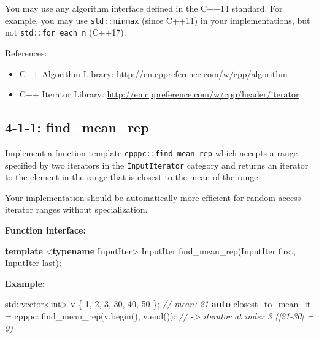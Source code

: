 \documentclass[]{article}
\newenvironment{Shaded}{}{}
\newcommand{\KeywordTok}[1]{\textcolor[rgb]{0.00,0.44,0.13}{\textbf{{#1}}}}
\newcommand{\DataTypeTok}[1]{\textcolor[rgb]{0.56,0.13,0.00}{{#1}}}
\newcommand{\DecValTok}[1]{\textcolor[rgb]{0.25,0.63,0.44}{{#1}}}
\newcommand{\CommentTok}[1]{\textcolor[rgb]{0.38,0.63,0.69}{\textit{{#1}}}}
\newcommand{\NormalTok}[1]{{#1}}
\providecommand{\tightlist}{%
  \setlength{\itemsep}{0pt}\setlength{\parskip}{0pt}}
\begin{document}
You may use any algorithm interface defined in the C++14 standard. For
example, you may use \texttt{std::minmax} (since C++11) in your
implementations, but not \texttt{std::for\_each\_n} (C++17).

References:

\begin{itemize}
\tightlist
\item
  C++ Algorithm Library:
  \url{http://en.cppreference.com/w/cpp/algorithm}
\item
  C++ Iterator Library:
  \url{http://en.cppreference.com/w/cpp/header/iterator}
\end{itemize}

\subsection{4-1-1: find\_mean\_rep}\label{findux5fmeanux5frep}

Implement a function template \texttt{cpppc::find\_mean\_rep} which
accepts a range specified by two iterators in the \texttt{InputIterator}
category and returns an iterator to the element in the range that is
closest to the mean of the range.

Your implementation should be automatically more efficient for random
access iterator ranges without specialization.

\textbf{Function interface:}

\begin{Shaded}
\begin{Highlighting}[]
\KeywordTok{template} \NormalTok{<}\KeywordTok{typename} \NormalTok{InputIter>}
\NormalTok{InputIter find_mean_rep(InputIter first, InputIter last);}
\end{Highlighting}
\end{Shaded}

\textbf{Example:}

\begin{Shaded}
\begin{Highlighting}[]
\NormalTok{std::vector<}\DataTypeTok{int}\NormalTok{> v \{ }\DecValTok{1}\NormalTok{, }\DecValTok{2}\NormalTok{, }\DecValTok{3}\NormalTok{, }\DecValTok{30}\NormalTok{, }\DecValTok{40}\NormalTok{, }\DecValTok{50} \NormalTok{\}; }\CommentTok{// mean: 21}
\KeywordTok{auto} \NormalTok{closest_to_mean_it = cpppc::find_mean_rep(v.begin(), v.end());}
\CommentTok{// -> iterator at index 3 (|21-30| = 9)}
\end{Highlighting}
\end{Shaded}
\end{document}
